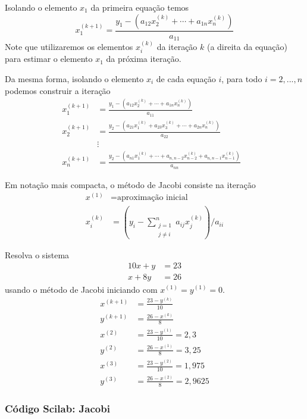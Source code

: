 Isolando o elemento $x_1$ da primeira equação temos
\begin{equation}
x_1^{(k+1)}= \frac{y_1 - \left(a_{12}x_2^{(k)}+\cdots+a_{1n}x_n^{(k)}\right)}{a_{11}} 
\end{equation}
Note que utilizaremos os elementos $x_i^{(k)}$ da iteração $k$ (a direita da equação) para estimar o elemento $x_1$ da próxima iteração. 

Da mesma forma, isolando o elemento $x_i$ de cada equação $i$, para todo $i=2,...,n$ podemos construir a iteração
\begin{align}
x_1^{(k+1)}&=\frac{y_1 - \left(a_{12}x_2^{(k)}+\cdots+a_{1n}x_n^{(k)}\right)}{a_{11}}\\
x_2^{(k+1)}&=\frac{y_2 - \left(a_{21}x_1^{(k)}+a_{23}x_3^{(k)}+\cdots+a_{2n}x_n^{(k)}\right)}{a_{22}}\\
&\vdots&\\
x_n^{(k+1)}&=\frac{y_2 - \left(a_{n1}x_1^{(k)}+\cdots+a_{n,n-2}x_{n-2}^{(k)}+a_{n,n-1}x_{n-1}^{(k)}\right)}{a_{nn}}
\end{align}

Em notação mais compacta, o método de Jacobi consiste na iteração
\begin{align}\displaystyle
  x^{(1)}   &= \text{aproximação inicial}\\
  x_i^{(k)} &= \left(y_i - \sum_{\substack{j=1\\j\ne i}}^{n} a_{ij}x_j^{(k)} \right)/{a_{ii}}
\end{align}

\begin{ex}
Resolva o sistema
\begin{align}
 10x+y&=23\\
 x+8y &=26
\end{align}
usando o método de Jacobi iniciando com $x^{(1)}=y^{(1)}=0$.
\begin{align*}
x^{(k+1)}&=\frac{23-y^{(k)}}{10}\\
y^{(k+1)}&=\frac{26-x^{(k)}}{8}\\
x^{(2)}&=\frac{23-y^{(1)}}{10}=2,3\\
y^{(2)}&=\frac{26-x^{(1)}}{8}=3,25\\
x^{(3)}&=\frac{23-y^{(2)}}{10}=1,975 \\
y^{(3)}&=\frac{26-x^{(2)}}{8}=2,9625
\end{align*}
\end{ex}

\ifisscilab
\subsubsection{Código Scilab: Jacobi}

